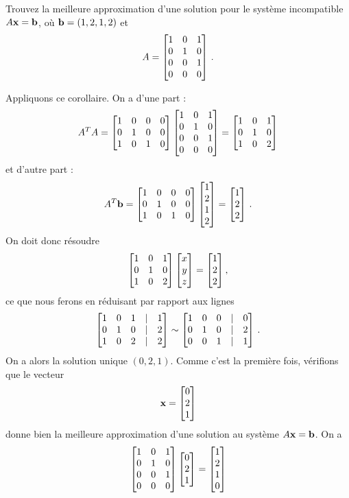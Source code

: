 \begin{myprob}
Trouvez la meilleure approximation d'une solution pour le système incompatible $A\xx = \bb$, où $\bb = (1,2,1,2)$ et
$$
A = \mat{1 & 0 & 1 \\ 0 & 1 & 0 \\ 0 & 0 & 1\\ 0 & 0 & 0}\,.
$$
 
\begin{mysol}
Appliquons ce corollaire.
On a d'une part :
$$
A^T A = \mat{1 & 0 & 0 & 0\\ 0 & 1 & 0 & 0 \\ 1 & 0 & 1 & 0}
\mat{1 & 0 & 1 \\ 0 & 1 & 0 \\ 0 & 0 & 1\\ 0 & 0 & 0}
=\mat{1 & 0 & 1\\ 0 & 1 & 0 \\ 1 & 0 & 2}
$$
et d'autre part :
$$
A^T\bb = \mat{1 & 0 & 0 & 0\\ 0 & 1 & 0 & 0 \\ 1 & 0 & 1 & 0}\mat{1\\2\\1\\2} = \mat{1 \\ 2\\ 2}\,.
$$
On doit donc r\'esoudre
$$
\mat{1 & 0 & 1\\ 0 & 1 & 0 \\ 1 & 0 & 2}\mat{x\\y\\z} = \mat{1 \\ 2\\ 2},
$$
ce que nous ferons en r\'eduisant par rapport aux lignes
$$
\mat{1 & 0 & 1 &|& 1\\ 0 & 1 & 0 &|& 2\\ 1 & 0 & 2&|& 2}
\sim 
\mat{
1 & 0 & 0 &|& 0\\ 
0 & 1 & 0 &|& 2\\ 
0 & 0 & 1&|& 1}\,.
$$
On a alors la solution unique $(0,2,1)$.  Comme c'est la première fois, vérifions que le vecteur
$$
\xx=\mat{0\\2\\1}
$$
donne bien la meilleure approximation d'une solution au
système $A \xx = \bb$. On a
$$
\mat{1 & 0 & 1 \\ 0 & 1 & 0 \\ 0 & 0 & 1\\ 0 & 0 & 0}\mat{0\\2\\1} = \mat{1\\2\\1\\0}
$$
\end{mysol}
\end{myprob}
